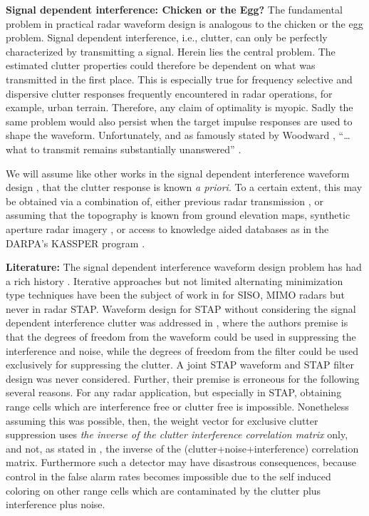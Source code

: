 \documentclass[11pt,draftclsnofoot,onecolumn]{IEEEtran}
\theoremstyle{definition}
\theoremstyle{remark}
\begin{document}
{\bf Signal dependent interference: Chicken or the Egg?} The fundamental problem in practical radar waveform design  is analogous to the chicken or the egg problem. Signal dependent interference, i.e., clutter, can only be perfectly characterized by transmitting a signal. Herein lies the central problem. The estimated clutter properties could therefore be dependent on what was transmitted in the first place. This is especially true for frequency selective and dispersive clutter responses frequently encountered in radar operations, for example, urban terrain. Therefore, any claim of optimality is myopic. Sadly the same problem would also persist when the target impulse responses are used to shape the waveform. Unfortunately, and  as famously stated by Woodward \cite{woodward1952information,
woodward1953theory}, ``\ldots what to transmit remains substantially unanswered''  \cite{woodward1953probability,Benedetto2009}. 

We will assume like other works in the signal dependent interference waveform design
\cite{Delong1967,Delong1969,Delong1970,Kay2007,vaidyanathan2009,
Pillai2000,Demaio2012,Demaio2013,Hongbin2014}, that the clutter response is known {\it a priori}. To a certain extent, this may be obtained via a combination of, either previous radar transmission \cite{cochran2009waveform}, or  assuming that the topography is known from ground elevation maps, synthetic aperture radar imagery \cite{SetlurJSTSP2014}, or access to knowledge aided databases as in the DARPA's KASSPER program \cite{Guerci2006}. 

{\bf Literature:}
The signal dependent interference waveform design problem has had a rich history \cite{middleton1996,van2004detection}. Iterative approaches but not limited alternating minimization type techniques have been the subject of work in \cite{Delong1967,Delong1969,Delong1970,Kay2007,vaidyanathan2009,
Pillai2000,Stoica2012,Demaio2012,Demaio2013,Hongbin2014} for SISO, MIMO radars but never in radar STAP. Waveform design for STAP without considering the signal dependent interference clutter was addressed in \cite{pattonstap2012}, where the authors premise is that the degrees of freedom from the waveform could be used in suppressing the interference and noise, while the degrees of freedom from the filter could be used  exclusively for suppressing the clutter. A joint STAP waveform and STAP filter design was never considered. Further, their premise is erroneous for the following several reasons. For any radar application, but especially in STAP, obtaining range cells which are interference free or clutter free is impossible. Nonetheless assuming this was possible, then, the weight vector for exclusive clutter suppression uses {\it the  inverse of the clutter interference correlation matrix} only, and not, as stated in \cite{pattonstap2012}, the inverse of the (clutter+noise+interference) correlation matrix. Furthermore such a detector may have disastrous consequences,  because control in the false alarm rates becomes impossible due to the self induced coloring on other range cells which are contaminated by the clutter plus interference plus noise.
\end{document}
